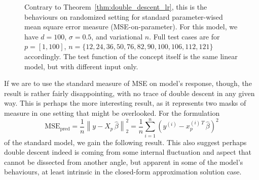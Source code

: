 \documentclass{article}
\begin{document}
\begin{figure}[htb]
  \caption{Contrary to Theorem~\ref{thm:double_descent_lr}, this is the behaviours on randomized setting for standard parameter-wised mean square error measure (MSE-on-parameter). For this model, we have $d=100$, $\sigma = 0.5$, and variational $n$. Full test cases are for $p=[1,100]$, $n=\{12,24,36,50,76,82,90,100,106,112,121\}$ accordingly. The test function of the concept itself is the same linear model, but with different input only.}
  \label{fig:11grid2}
\end{figure}
If we are to use the standard measure of MSE on model's response, though, the result is rather fairly disappointing, with no trace of double descent in any given way. This is perhaps the more interesting result, as it represents two masks of measure in one setting that might be overlooked. For the formulation
\begin{equation}
\mathrm{MSE}_{\mathrm{pred}}
=
\frac{1}{n}
\left\lVert
  y - X_{p}\,\hat\beta
\right\rVert_{2}^{2}
=
\frac{1}{n}
\sum_{i=1}^{n}
\left(
  y^{(i)} - x_{p}^{(i)\,T}\,\hat\beta
\right)^{2}
\end{equation}
of the standard model, we gain the following result. This also suggest perhaps double descent indeed is coming from some internal fluctuation and aspect that cannot be dissected from another angle, but apparent in some of the model's behaviours, at least intrinsic in the closed-form approximation solution case. 
\end{document}
